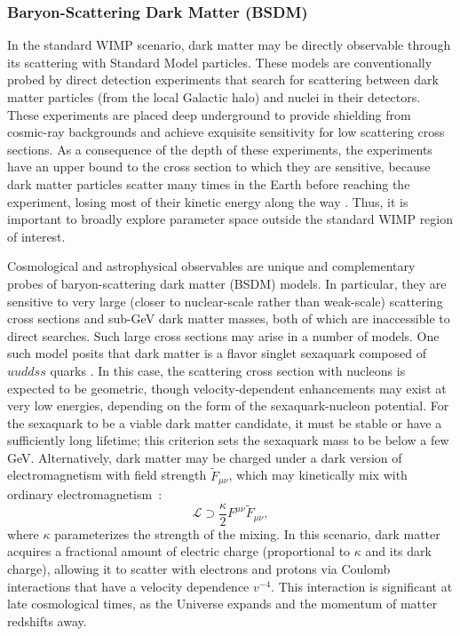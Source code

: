      
\subsubsection{Baryon-Scattering Dark Matter (BSDM) }
\label{sec:bsdm}

In the standard WIMP scenario, dark matter may be directly observable through its scattering with Standard Model particles.
These models are conventionally probed by direct detection experiments that search for scattering between dark matter particles (from the local Galactic halo) and nuclei in their detectors.
These experiments are placed deep underground to provide shielding from cosmic-ray backgrounds and achieve exquisite sensitivity for low scattering cross sections. As a consequence of the depth of these experiments, the experiments have an upper bound to the cross section to which they are sensitive, because dark matter particles scatter many times in the Earth before reaching the experiment, losing most of their kinetic energy along the way \citep{Zaharijas:2004jv}.
Thus, it is important to broadly explore parameter space outside the standard WIMP region of interest.

Cosmological and astrophysical observables are unique and complementary probes of baryon-scattering dark matter (BSDM) models.
In particular, they are sensitive to very large (closer to nuclear-scale rather than weak-scale) scattering cross sections and sub-GeV dark matter masses, both of which are inaccessible to direct searches.
Such large cross sections may arise in a number of models.
One such model posits that dark matter is a flavor singlet sexaquark composed of $uuddss$ quarks \citep{Farrar:2017eqq}.
In this case, the scattering cross section with nucleons is expected to be geometric, though velocity-dependent enhancements may exist at very low energies, depending on the form of the sexaquark-nucleon potential.
For the sexaquark to be a viable dark matter candidate, it must be stable or have a sufficiently long lifetime; this criterion sets the sexaquark mass to be below a few GeV.
Alternatively, dark matter may be charged under a dark version of electromagnetism with field strength $\tilde{F}_{\mu\nu}$, which may kinetically mix with ordinary electromagnetism~\citep{Holdom:1985ag}:
\begin{equation}
    \mathcal{L} \supset \frac{\kappa}{2} F^{\mu\nu} \tilde{F}_{\mu\nu} ,
\end{equation}
where $\kappa$ parameterizes the strength of the mixing.
In this scenario, dark matter acquires a fractional amount of electric charge (proportional to $\kappa$ and its dark charge), allowing it to scatter with electrons and protons via Coulomb interactions that have a velocity dependence $v^{-4}$.
This interaction is significant at late cosmological times, as the Universe expands and the momentum of matter redshifts away.

